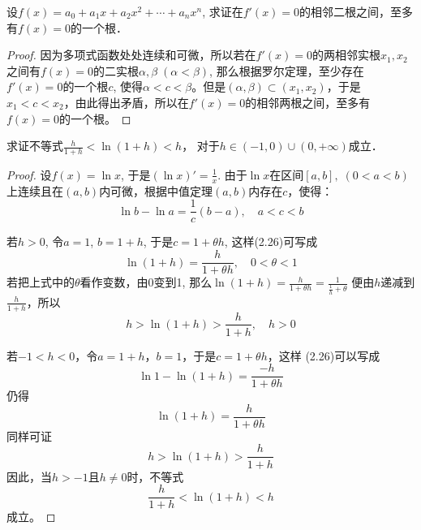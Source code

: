 \begin{example}
    设$f(x)=a_0+a_1x+a_2x^2+\cdots+a_nx^n$, 求证在$f'(x)=0$的相邻二根之间，至多有$f(x)=0$的一个根．   
\end{example}

\begin{proof}
因为多项式函数处处连续和可微，所以若在$f'(x)=0$的两相邻实根$x_1,x_2$之间有$f(x)=0$的二实根$\alpha,\beta\; (\alpha<\beta)$, 那么根据罗尔定理，至少存在$f'(x)=0$的一个根$c$, 使得$\alpha<c<\beta$。但是$(\alpha,\beta)\subset (x_1,x_2)$，于是$x_1<c<x_2$，由此得出矛盾，所以在$f'(x)=0$的相邻两根之间，至多有$f(x)=0$的一个根。
\end{proof}


    

\begin{example}
    求证不等式$\frac{h}{1+h}<\ln(1+h)<h$，
    对于$h\in (-1, 0)\cup (0,+\infty)$成立．
\end{example}


\begin{proof}
    设$f(x)=\ln x$, 于是$(\ln x)'=\frac{1}{x}$. 由于$\ln x$在区间$[a,b],\; (0<a<b)$上连续且在$(a,b)$内可微，根据中值定理$(a,b)$内存在$c$，使得：
\begin{equation}
    \ln b-\ln a=\frac{1}{c}(b-a),\quad a<c<b
\end{equation}

若$h>0$, 令$a=1$, $b=1+h$, 于是$c=1+\theta h$, 这样(2.26)可写成
\[\ln (1+h) =\frac{h}{1+\theta h},\quad 0<\theta<1\]
若把上式中的$\theta$看作变数，由0变到1, 那么$\ln(1+h)=\frac{h}{1+\theta h}=\frac{1}{\frac{1}{h}+\theta}$
便由$h$递减到$\frac{h}{1+h}$，所以
\[h>\ln(1+h)>\frac{h}{1+h},\quad h>0\]

若$-1<h<0$，令$a=1+h$，$b=1$，于是$c=1+\theta h$，这样
(2.26)可以写成
\[\ln1-\ln (1+h) =\frac{-h}{1+\theta h}\]
仍得
\[\ln (1+h) =\frac{h}{1+\theta h}\]
同样可证
\[h> \ln (1+h) >\frac{h}{1+h}\]
因此，当$h>-1$且$h\ne 0$时，不等式
\[\frac{h}{1+h}<\ln(1+h)<h\]
成立。
\end{proof}

